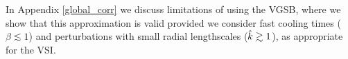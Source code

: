  In Appendix \ref{global_corr}  we discuss limitations of using
  the VGSB, where we show that this approximation is valid provided we 
  consider fast cooling times
  ($\beta\lesssim 1$) and perturbations with small radial lengthscales
  ($\hat{k}\gtrsim 1$), as appropriate for the VSI.  












  





